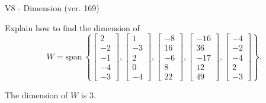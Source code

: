 \begin{exercise}
  \begin{exerciseTitle}V8 - Dimension (ver. 169)\end{exerciseTitle}
  \begin{exerciseStatement}
    Explain how to find the dimension of 
\[W=\mathrm{span}\ \left\{\left[\begin{array}{r}
2 \\
-2 \\
-1 \\
-4 \\
-3
\end{array}\right] , \left[\begin{array}{r}
1 \\
-3 \\
2 \\
0 \\
-4
\end{array}\right] , \left[\begin{array}{r}
-8 \\
16 \\
-6 \\
8 \\
22
\end{array}\right] , \left[\begin{array}{r}
-16 \\
36 \\
-17 \\
12 \\
49
\end{array}\right] , \left[\begin{array}{r}
-4 \\
-2 \\
-4 \\
2 \\
-3
\end{array}\right]\right\}.\]



  \end{exerciseStatement}
  \begin{exerciseAnswer}
   The dimension of \(W\) is  \(3\).
  


  \end{exerciseAnswer}
\end{exercise}